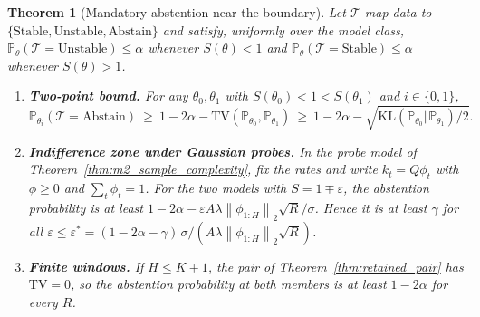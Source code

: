 \documentclass[10pt,twocolumn,letterpaper]{article}
\newtheorem{theorem}{Theorem}[section]
\theoremstyle{definition}
\theoremstyle{remark}
\newcommand{\norm}[1]{\left\lVert #1\right\rVert}
\begin{document}
\begin{theorem}[Mandatory abstention near the boundary]
\label{thm:m3_minimax_abstention}
Let $\mathcal{T}$ map data to $\{\mathrm{Stable}, \mathrm{Unstable}, \mathrm{Abstain}\}$ and satisfy, uniformly over the model class, $\mathbb{P}_\theta(\mathcal{T} = \mathrm{Unstable}) \le \alpha$ whenever $S(\theta)<1$ and $\mathbb{P}_\theta(\mathcal{T} = \mathrm{Stable}) \le \alpha$ whenever $S(\theta)>1$.
\begin{enumerate}
    \item \textbf{Two-point bound.} For any $\theta_0,\theta_1$ with $S(\theta_0)<1<S(\theta_1)$ and $i\in\{0,1\}$,
    \begin{equation}
        \mathbb{P}_{\theta_i}(\mathcal{T}=\mathrm{Abstain})\ \ge\ 1-2\alpha-\mathrm{TV}(\mathbb{P}_{\theta_0},\mathbb{P}_{\theta_1})\ \ge\ 1-2\alpha-\sqrt{\mathrm{KL}(\mathbb{P}_{\theta_0}\Vert\mathbb{P}_{\theta_1})/2}.
        \label{eq:indifference_zone}
    \end{equation}
    \item \textbf{Indifference zone under Gaussian probes.} In the probe model of Theorem~\ref{thm:m2_sample_complexity}, fix the rates and write $k_t=Q\phi_t$ with $\phi\ge0$ and $\sum_t\phi_t=1$. For the two models with $S=1\mp\varepsilon$, the abstention probability is at least $1-2\alpha-\varepsilon A\lambda\norm{\phi_{1:H}}_2\sqrt R/\sigma$. Hence it is at least $\gamma$ for all $\varepsilon\le\varepsilon^*=(1-2\alpha-\gamma)\,\sigma/(A\lambda\norm{\phi_{1:H}}_2\sqrt R)$.
    \item \textbf{Finite windows.} If $H\le K+1$, the pair of Theorem~\ref{thm:retained_pair} has $\mathrm{TV}=0$, so the abstention probability at both members is at least $1-2\alpha$ for every $R$.
\end{enumerate}
\end{theorem}
\end{document}
